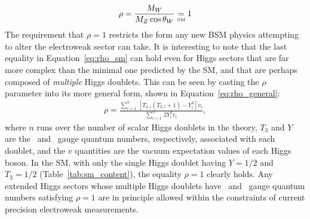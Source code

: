 \begin{align}
    \rho = \frac{
                M_W
            }
            {
                M_Z \cos \theta_W
            }
        \underset{\text{\tiny{SM}}}{=} 1
    \label{eq:rho_sm}
\end{align}
The requirement that $\rho = 1$ restricts the form any new BSM physics attempting to alter
the electroweak sector can take.
It is interesting to note that the last equality in Equation~\ref{eq:rho_sm} can hold even for Higgs sectors that are far more complex than
the minimal one predicted by the SM, and that are perhaps composed of \textit{multiple} Higgs doublets.
This can be seen by casting the $\rho$ parameter into its more general form, shown in Equation~\ref{eq:rho_general}:
\begin{align}
    \rho = \frac{
                \sum\limits_{i = 1}^n \, \left[ T_{3,i} \left( T_{3,i} + 1 \right) - Y_i^2 \right ] v_i
            }
            {
                \sum\limits_{i=1}^n \, 2 Y_i^2 v_i
            },
    \label{eq:rho_general}
\end{align}
where $n$ runs over the number of scalar Higgs doublets in the theory, $T_{3}$ and $Y$ are the \SUtwo~and \Uone~gauge
quantum numbers, respectively, associated with each doublet, and the $v$ quantities are the vacuum expectation values of
each Higgs boson.
In the SM, with only the single Higgs doublet having $Y = 1/2$ and $T_3 = 1/2$ (Table~\ref{tab:sm_content}),
the equality $\rho = 1$ clearly holds.
Any extended Higgs sectors whose multiple Higgs doublets have \SUtwo~and \Uone~gauge quantum numbers
satisfying $\rho = 1$ are in principle allowed within the constraints of current precision electroweak measurements.

